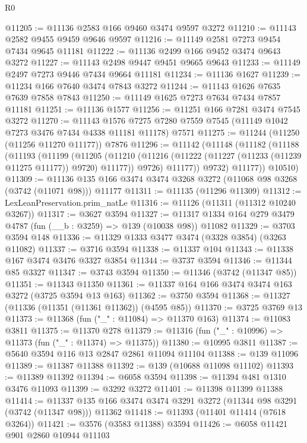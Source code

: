 \begin{lexlean}{R0}
\begin{coremodule}
@11205 := @11136 @2583 @166 @9460 @3474 @9597 @3272
@11210 := @11143 @2582 @9455 @9459 @9646 @9597
@11216 := @11149 @2581 @7273 @9454 @7434 @9645 @11181
@11222 := @11136 @2499 @166 @9452 @3474 @9643 @3272
@11227 := @11143 @2498 @9447 @9451 @9665 @9643
@11233 := @11149 @2497 @7273 @9446 @7434 @9664 @11181
@11234 := @11136 @1627
@11239 := @11234 @166 @7640 @3474 @7843 @3272
@11244 := @11143 @1626 @7635 @7639 @7858 @7843
@11250 := @11149 @1625 @7273 @7634 @7434 @7857 @11181
@11251 := @11136 @1577
@11256 := @11251 @166 @7281 @3474 @7545 @3272
@11270 := @11143
    @1576
    @7275
    @7280
    @7559
    @7545
    (@11149 @1042 @7273 @3476 @7434 @4338 @11181 @11178)
    @7571
@11275 := @11244 (@11250 (@11256 @11270 @11177)) @7876
@11296 := @11142
    (@11148
      (@11182
        (@11188
          (@11193
            (@11199
              (@11205
                (@11210
                  (@11216 (@11222 (@11227 (@11233 (@11239 @11275 @11177)) @9720) @11177))
                  @9726)
                @11177))
            @9732)
          @11177))
      @10510)
@11309 := @11136 @135 @166 @3474 @3474 @3268 @3272 (@11068 @98 @3268 (@3742 (@11071 @98))) @11177
@11311 := @11135 (@11296 @11309)
@11312 := LexLeanPreservation.prim_natLe
@11316 := @11126 (@11311 (@11312 @10240 @3267))
@11317 := @3627 @3594
@11327 := @11317 @1334 @164 @279 @3479 @4787 (fun (__b : @3259) => @139 (@10038 @98)) @11082
@11329 := @3703 @3594 @148
@11336 := @11329 @1333 @3477 @3474 (@3328 @3854) (@3263 @11082)
@11337 := @3716 @3594
@11338 := @11337 @104
@11343 := @11338 @167 @3474 @3476 @3327 @3854
@11344 := @3737 @3594
@11346 := @11344 @85 @3327
@11347 := @3743 @3594
@11350 := @11346 (@3742 (@11347 @85))
@11351 := @11343 @11350
@11361 := @11337 @164 @166 @3474 @3474 @163 @3272 (@3725 @3594 @13 @163)
@11362 := @3750 @3594
@11368 := @11327 (@11336 (@11351 (@11361 @11362)) (@4595 @85))
@11370 := @3725 @3769 @13
@11373 := @11368 (fun ("_" : @11084) => @11370 @163)
@11374 := @11083 @3811
@11375 := @11370 @278
@11379 := @11316 (fun ("_" : @10996) => @11373 (fun ("_" : @11374) => @11375))
@11380 := @10995 @3811
@11387 := @5640 @3594 @116 @13 @2847 @2861 @11094 @11104
@11388 := @139 @11096
@11389 := @11387 @11388
@11392 := @139 (@10688 @11098 @11102)
@11393 := @11389 @11392
@11394 := @6058 @3594
@11398 := @11394 @481 @1310 @3476 @11093
@11399 := @3292 @3272
@11401 := @11398 @11399 @11388
@11414 := @11337 @135 @166 @3474 @3474 @3291 @3272 (@11344 @98 @3291 (@3742 (@11347 @98))) @11362
@11418 := @11393 (@11401 @11414 (@7618 @3264))
@11421 := @3576 (@3583 @11388) @3594
@11426 := @6058 @11421 @901 @2860 @10944 @11103

\end{coremodule}
\end{lexlean}
